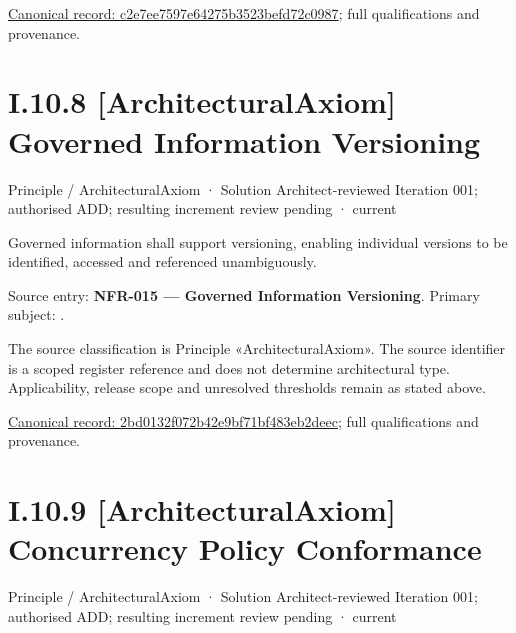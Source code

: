 {\footnotesize \href{../../../../../../../../continuum/motivation/principle/architectural-axiom/c2e7ee7597e64275b3523befd72c0987.md}{Canonical record: c2e7ee7597e64275b3523befd72c0987}; full qualifications and provenance.}\par
\section*{I.10.8 [ArchitecturalAxiom] Governed Information Versioning}
\label{navigation:I.10.8}

\label{element:2bd0132f072b42e9bf71bf483eb2deec}
{\small Principle / ArchitecturalAxiom · Solution Architect-reviewed Iteration 001; authorised ADD; resulting increment review pending · current}\par

Governed information shall support versioning, enabling individual versions to be identified, accessed and referenced unambiguously.



Source entry: \textbf{NFR-015 — Governed Information Versioning}. Primary subject: \texttt{}.



The source classification is Principle «ArchitecturalAxiom». The source identifier is a scoped register reference and does not determine architectural type. Applicability, release scope and unresolved thresholds remain as stated above.


{\footnotesize \href{../../../../../../../../continuum/motivation/principle/architectural-axiom/2bd0132f072b42e9bf71bf483eb2deec.md}{Canonical record: 2bd0132f072b42e9bf71bf483eb2deec}; full qualifications and provenance.}\par
\section*{I.10.9 [ArchitecturalAxiom] Concurrency Policy Conformance}
\label{navigation:I.10.9}

\label{element:7e3b05a2e3e547cbbd26b1e181af0d10}
{\small Principle / ArchitecturalAxiom · Solution Architect-reviewed Iteration 001; authorised ADD; resulting increment review pending · current}\par

